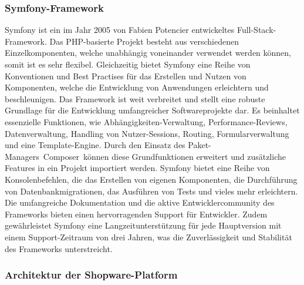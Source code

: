 \subsubsection{Symfony-Framework}

Symfony ist ein im Jahr 2005 von Fabien Potencier entwickeltes Full-Stack-Framework.
Das PHP-basierte Projekt besteht aus verschiedenen Einzelkomponenten, welche unabhängig voneinander verwendet werden
können, somit ist es sehr flexibel.
Gleichzeitig bietet Symfony eine Reihe von Konventionen und Best Practises für das Erstellen und Nutzen von Komponenten,
welche die Entwicklung von Anwendungen erleichtern und beschleunigen.
Das Framework ist weit verbreitet und stellt eine robuste Grundlage für die Entwicklung umfangreicher Softwareprojekte
dar.
Es beinhaltet essenzielle Funktionen, wie Abhängigkeiten-Verwaltung, Performance-Reviews, Datenverwaltung,
Handling von Nutzer-Sessions, Routing, Formularverwaltung und eine Template-Engine.
Durch den Einsatz des Paket-Managers\ \glqq Composer\grqq\ können diese Grundfunktionen erweitert und zusätzliche
Features in ein Projekt importiert werden.
Symfony bietet eine Reihe von Konsolenbefehlen, die das Erstellen von eigenen Komponenten, die Durchführung von
Datenbankmigrationen, das Ausführen von Tests und vieles mehr erleichtern.
Die umfangreiche Dokumentation und die aktive Entwicklercommunity des Frameworks bieten einen hervorragenden Support
für Entwickler.
Zudem gewährleistet Symfony eine Langzeitunterstützung für jede Hauptversion mit einem Support-Zeitraum von drei Jahren,
was die Zuverlässigkeit und Stabilität des Frameworks unterstreicht.

\subsubsection{Architektur der Shopware-Platform}

